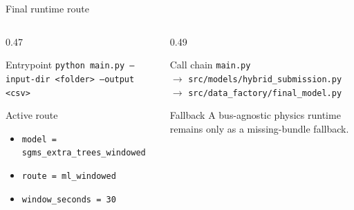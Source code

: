 ﻿\documentclass[10pt,aspectratio=169]{beamer}
\newcommand{\code}[1]{\texttt{\footnotesize #1}}
\begin{document}
\iffalse
\begin{frame}{Final runtime route}
\small
\begin{columns}[T,totalwidth=\textwidth]
\begin{column}{0.47\textwidth}
\begin{block}{Entrypoint}
\code{python main.py --input-dir <folder> --output <csv>}
\end{block}
\begin{block}{Active route}
\begin{itemize}
  \item \code{model = sgms\_extra\_trees\_windowed}
  \item \code{route = ml\_windowed}
  \item \code{window\_seconds = 30}
\end{itemize}
\end{block}
\end{column}
\begin{column}{0.49\textwidth}
\begin{exampleblock}{Call chain}
\code{main.py}\\
$\rightarrow$ \code{src/models/hybrid\_submission.py}\\
$\rightarrow$ \code{src/data\_factory/final\_model.py}
\end{exampleblock}
\begin{alertblock}{Fallback}
A bus-agnostic physics runtime remains only as a missing-bundle fallback.
\end{alertblock}
\end{column}
\end{columns}
\end{frame}
\end{document}
